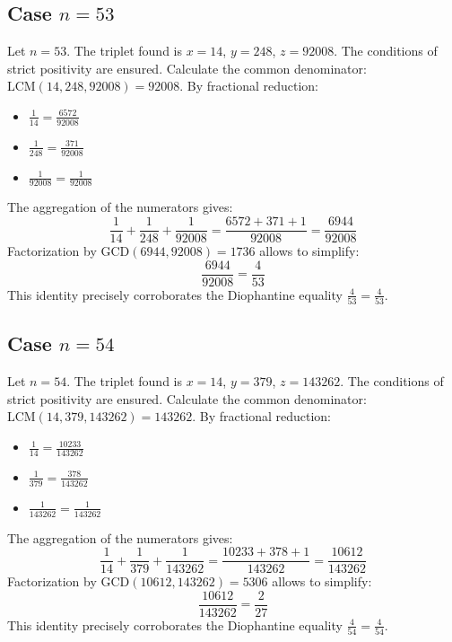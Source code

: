 \documentclass[11pt,a4paper]{article}
\begin{document}
\subsection{Case $n = 53$}
Let $n = 53$. The triplet found is $x = 14$, $y = 248$, $z = 92008$.
The conditions of strict positivity are ensured.
Calculate the common denominator: $\text{LCM}(14, 248, 92008) = 92008$.
By fractional reduction:
\begin{itemize}
    \item $\frac{1}{14} = \frac{6572}{92008}$
    \item $\frac{1}{248} = \frac{371}{92008}$
    \item $\frac{1}{92008} = \frac{1}{92008}$
\end{itemize}
The aggregation of the numerators gives:
$$ \frac{1}{14} + \frac{1}{248} + \frac{1}{92008} = \frac{6572 + 371 + 1}{92008} = \frac{6944}{92008} $$
Factorization by $\text{GCD}(6944, 92008) = 1736$ allows to simplify:
$$ \frac{6944}{92008} = \frac{4}{53} $$
This identity precisely corroborates the Diophantine equality $\frac{4}{53} = \frac{4}{53}$.

\subsection{Case $n = 54$}
Let $n = 54$. The triplet found is $x = 14$, $y = 379$, $z = 143262$.
The conditions of strict positivity are ensured.
Calculate the common denominator: $\text{LCM}(14, 379, 143262) = 143262$.
By fractional reduction:
\begin{itemize}
    \item $\frac{1}{14} = \frac{10233}{143262}$
    \item $\frac{1}{379} = \frac{378}{143262}$
    \item $\frac{1}{143262} = \frac{1}{143262}$
\end{itemize}
The aggregation of the numerators gives:
$$ \frac{1}{14} + \frac{1}{379} + \frac{1}{143262} = \frac{10233 + 378 + 1}{143262} = \frac{10612}{143262} $$
Factorization by $\text{GCD}(10612, 143262) = 5306$ allows to simplify:
$$ \frac{10612}{143262} = \frac{2}{27} $$
This identity precisely corroborates the Diophantine equality $\frac{4}{54} = \frac{4}{54}$.
\end{document}
